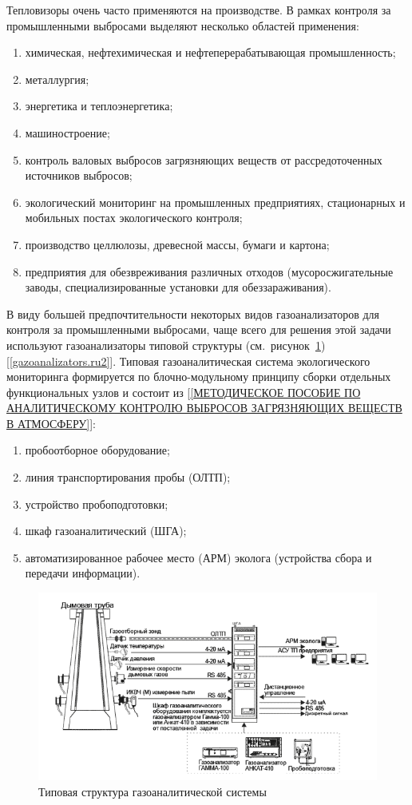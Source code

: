 \documentclass[14pt, a4paper]{extreport}
\begin{document}
	Тепловизоры очень часто применяются на производстве. В рамках контроля за промышленными выбросами выделяют несколько областей применения:
	\begin{enumerate}[label={\arabic*)}]
		\item химическая, нефтехимическая и нефтеперерабатывающая промышленность;
		\item металлургия;
		\item энергетика и теплоэнергетика;
		\item машиностроение;
		\item контроль валовых выбросов загрязняющих веществ от рассредоточенных источников выбросов;
		\item экологический мониторинг на промышленных предприятиях, стационарных и мобильных постах экологического контроля;
		\item производство целлюлозы, древесной массы, бумаги и картона;
		\item предприятия для обезвреживания различных отходов (мусоросжигательные заводы, специализированные установки для обеззараживания).
	\end{enumerate}

	В виду большей предпочтительности некоторых видов газоанализаторов для контроля за промышленными выбросами, чаще всего для решения этой задачи используют газоанализаторы типовой структуры (см.~рисунок~\ref{fig:typestructure}) [\ref{gazoanalizators.ru2}]. Типовая газоаналитическая система экологического мониторинга формируется по блочно-модульному принципу сборки отдельных функциональных узлов и состоит из [\ref{МЕТОДИЧЕСКОЕ ПОСОБИЕ ПО АНАЛИТИЧЕСКОМУ КОНТРОЛЮ ВЫБРОСОВ ЗАГРЯЗНЯЮЩИХ ВЕЩЕСТВ В АТМОСФЕРУ}]:
	\begin{enumerate}[label={\arabic*)}]
		\item пробоотборное оборудование;
		\item линия транспортирования пробы (ОЛТП);
		\item устройство пробоподготовки;
		\item шкаф газоаналитический (ШГА);
		\item автоматизированное рабочее место (АРМ) эколога (устройства сбора и передачи информации).
	\end{enumerate}
	
	\begin{figure}[h!]
		\centering
		\includegraphics[width = \textwidth]{image/chapter_1/typestructure}	
		\caption{Типовая структура газоаналитической системы}
 		\label{fig:typestructure}
	\end{figure}
\end{document}
